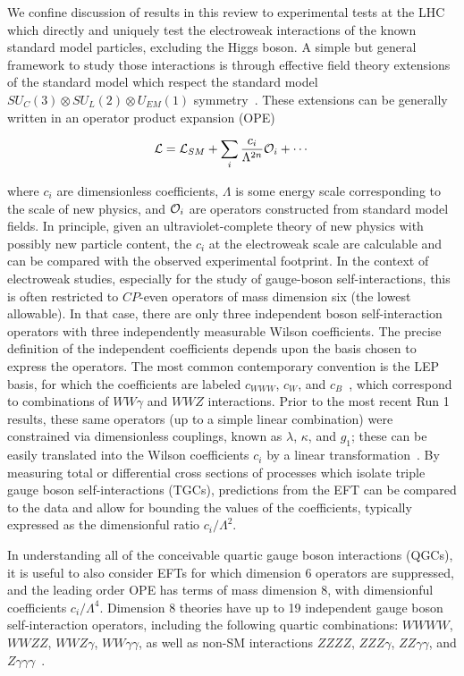 
We confine discussion of results in this review to experimental tests
at the LHC which directly and uniquely test the electroweak
interactions of the known standard model particles, excluding the
Higgs boson. A simple but general framework to study those
interactions is through effective field theory extensions of the
standard model which respect the standard model $SU_C(3) \otimes
SU_L(2) \otimes U_{EM}(1)$
symmetry~\cite{Weinberg:1978kz,Weinberg:1980wa,Georgi:1994qn}.  These
extensions can be generally written in an operator product expansion
(OPE)

$$ \mathcal{L} = \mathcal{L}_{SM} + \sum_i \frac{c_i}{\Lambda^{2n}}{\cal O}_i + \cdots$$

where $c_i$ are dimensionless coefficients, $\Lambda$ is some energy
scale corresponding to the scale of new physics, and ${\cal O}_i$ are
operators constructed from standard model fields.  In principle, given
an ultraviolet-complete theory of new physics with possibly new
particle content, the $c_i$ at the electroweak scale are calculable
and can be compared with the observed experimental footprint. In the
context of electroweak studies, especially for the study of
gauge-boson self-interactions, this is often restricted to $CP$-even
operators of mass dimension six (the lowest allowable).  In that case,
there are only three independent boson self-interaction operators with
three independently measurable Wilson coefficients. The precise
definition of the independent coefficients depends upon the basis
chosen to express the operators.  The most common contemporary
convention is the LEP basis, for which the coefficients are labeled
$c_{WWW}$, $c_W$, and $c_B$~\cite{Hagiwara:1993ck,Degrande:2012wf},
which correspond to combinations of $WW\gamma$ and $WWZ$ interactions.
Prior to the most recent Run 1 results, these same operators (up to a
simple linear combination) were constrained via dimensionless
couplings, known as $\lambda$, $\kappa$, and $g_1$; these can be
easily translated into the Wilson coefficients $c_i$ by a linear
transformation~\cite{Degrande:2012wf}.  By measuring total or
differential cross sections of processes which isolate triple gauge
boson self-interactions (TGCs), predictions from the EFT can be
compared to the data and allow for bounding the values of the
coefficients, typically expressed as the dimensionful ratio
$c_i/\Lambda^2$.

In understanding all of the conceivable quartic gauge boson
interactions (QGCs), it is useful to also consider EFTs for which
dimension 6 operators are suppressed, and the leading order OPE has
terms of mass dimension 8, with dimensionful coefficients
$c_i/\Lambda^4$.  Dimension 8 theories have up to 19 independent gauge
boson self-interaction operators, including the following quartic
combinations: $WWWW$, $WWZZ$, $WWZ\gamma$, $WW\gamma\gamma$, as well
as non-SM interactions $ZZZZ$, $ZZZ\gamma$, $ZZ\gamma\gamma$, and
$Z\gamma\gamma\gamma$~\cite{Eboli:2006wa,Degrande:2013kka}.


